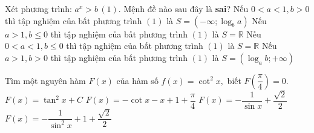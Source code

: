 \begin{ex}%
		Xét phương trình: $a^x>b \, (1)$. Mệnh đề nào sau đây là \textbf{sai}?
		\choice
		{\True Nếu $0<a<1,b>0$ thì tập nghiệm của bất phương trình $(1)$ là $S=\left({-\infty;\log_ba}\right)$}
		{Nếu $a>1,b\leqslant 0$ thì tập nghiệm của bất phương trình $(1)$ là $S=\mathbb{R}$}
		{Nếu $0<a<1,b\leqslant 0$ thì tập nghiệm của bất phương trình $(1)$ là $S=\mathbb{R}$}
		{Nếu $a>1,b>0$ thì tập nghiệm của bất phương trình $(1)$ là $S=\left({\log_ab;+\infty}\right)$}
\end{ex}
\begin{ex}%
		Tìm một nguyên hàm $F(x)$ của hàm số $f(x)=\cot^2x,$ biết $F\left(\dfrac{\pi}{4}\right)=0 $.
		\choice
		{$F(x)=\tan^2x+C$}
		{\True $F(x)=-\cot x-x+1+\dfrac{\pi}{4}$}
		{$F(x)=-\dfrac{1}{\sin x}+\dfrac{\sqrt{2}}{2}$}
		{$F(x)=-\dfrac{1}{{\sin}^2x}+1+\dfrac{\sqrt{2}}{2}$}
\end{ex}
